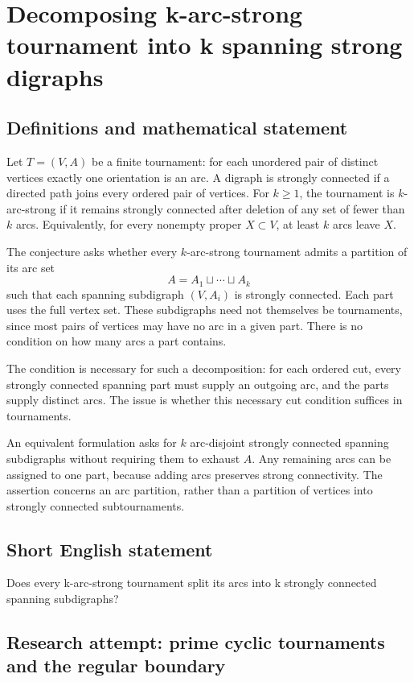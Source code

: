 \documentclass[11pt,a4paper]{article}
\begin{document}
\section*{Decomposing k-arc-strong tournament into k spanning strong digraphs}\label{statement}

\subsection{Definitions and mathematical statement}
Let $T=(V,A)$ be a finite tournament: for each unordered pair of distinct
vertices exactly one orientation is an arc. A digraph is strongly
connected if a directed path joins every ordered pair of vertices.
For $k\ge1$, the tournament is $k$-arc-strong if it remains strongly
connected after deletion of any set of fewer than $k$ arcs. Equivalently,
for every nonempty proper $X\subset V$, at least $k$ arcs leave $X$.

The conjecture asks whether every $k$-arc-strong tournament admits a
partition of its arc set
\[
                      A=A_1\sqcup\cdots\sqcup A_k
\]
such that each spanning subdigraph $(V,A_i)$ is strongly connected.
Each part uses the full vertex set. These subdigraphs need not themselves
be tournaments, since most pairs of vertices may have no arc in a
given part. There is no condition on how many arcs a part contains.

The condition is necessary for such a decomposition: for each ordered
cut, every strongly connected spanning part must supply an outgoing
arc, and the parts supply distinct arcs. The issue is whether this
necessary cut condition suffices in tournaments.

An equivalent formulation asks for $k$ arc-disjoint strongly connected
spanning subdigraphs without requiring them to exhaust $A$. Any remaining
arcs can be assigned to one part, because adding arcs preserves strong
connectivity. The assertion concerns an arc partition, rather than a
partition of vertices into strongly connected subtournaments.
\subsection{Short English statement}
Does every k-arc-strong tournament split its arcs into k strongly connected spanning subdigraphs?
\subsection{Research attempt: prime cyclic tournaments and the regular boundary}
\end{document}
